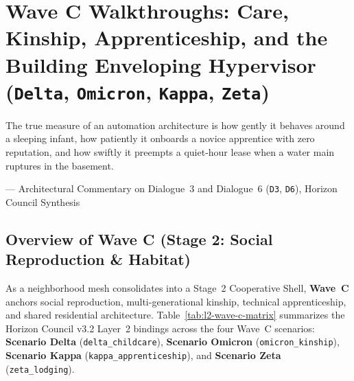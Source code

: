 \chapter{Wave C Walkthroughs: Care, Kinship, Apprenticeship, and the Building Enveloping Hypervisor (\texttt{Delta}, \texttt{Omicron}, \texttt{Kappa}, \texttt{Zeta})}
\label{ch:wave-c-walkthroughs}

\epigraph{The true measure of an automation architecture is how gently it behaves around a sleeping infant, how patiently it onboards a novice apprentice with zero reputation, and how swiftly it preempts a quiet-hour lease when a water main ruptures in the basement.}{--- Architectural Commentary on Dialogue~3 and Dialogue~6 (\texttt{D3}, \texttt{D6}), Horizon Council Synthesis}

\section{Overview of Wave C (Stage 2: Social Reproduction \& Habitat)}
\label{sec:l2-wave-c-overview}

As a neighborhood mesh consolidates into a Stage~2 Cooperative Shell, \textbf{Wave~C} anchors social reproduction, multi-generational kinship, technical apprenticeship, and shared residential architecture. Table~\ref{tab:l2-wave-c-matrix} summarizes the Horizon Council v3.2 Layer~2 bindings across the four Wave~C scenarios: \textbf{Scenario Delta} (\texttt{delta\_childcare}), \textbf{Scenario Omicron} (\texttt{omicron\_kinship}), \textbf{Scenario Kappa} (\texttt{kappa\_apprenticeship}), and \textbf{Scenario Zeta} (\texttt{zeta\_lodging}).

